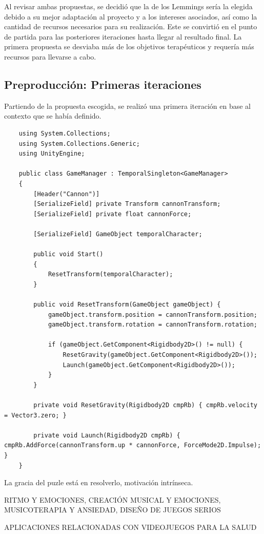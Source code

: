 Al revisar ambas propuestas, se decidió que la de los Lemmings sería la elegida debido a su mejor adaptación al proyecto y a los intereses asociados, así como la cantidad de recursos necesarios para su realización. Este se convirtió en el punto de partida para las posteriores iteraciones hasta llegar al resultado final. La primera propuesta se desviaba más de los objetivos terapéuticos y requería más recursos para llevarse a cabo.

\subsection{Preproducción: Primeras iteraciones}

Partiendo de la propuesta escogida, se realizó una primera iteración en base al contexto que se había definido.

\begin{lstlisting}
	using System.Collections;
	using System.Collections.Generic;
	using UnityEngine;
	
	public class GameManager : TemporalSingleton<GameManager>
	{
		[Header("Cannon")]
		[SerializeField] private Transform cannonTransform;
		[SerializeField] private float cannonForce;
		
		[SerializeField] GameObject temporalCharacter;
		
		public void Start()
		{
			ResetTransform(temporalCharacter);
		}
		
		public void ResetTransform(GameObject gameObject) {
			gameObject.transform.position = cannonTransform.position;
			gameObject.transform.rotation = cannonTransform.rotation;
			
			if (gameObject.GetComponent<Rigidbody2D>() != null) { 
				ResetGravity(gameObject.GetComponent<Rigidbody2D>());
				Launch(gameObject.GetComponent<Rigidbody2D>()); 
			}
		}
		
		private void ResetGravity(Rigidbody2D cmpRb) { cmpRb.velocity = Vector3.zero; }
		
		private void Launch(Rigidbody2D cmpRb) { cmpRb.AddForce(cannonTransform.up * cannonForce, ForceMode2D.Impulse); }
	}
\end{lstlisting}

La gracia del puzle está en resolverlo, motivación intrínseca.

RITMO Y EMOCIONES,
CREACIÓN MUSICAL Y EMOCIONES,
MUSICOTERAPIA Y ANSIEDAD,
DISEÑO DE JUEGOS SERIOS

APLICACIONES RELACIONADAS CON VIDEOJUEGOS PARA LA SALUD